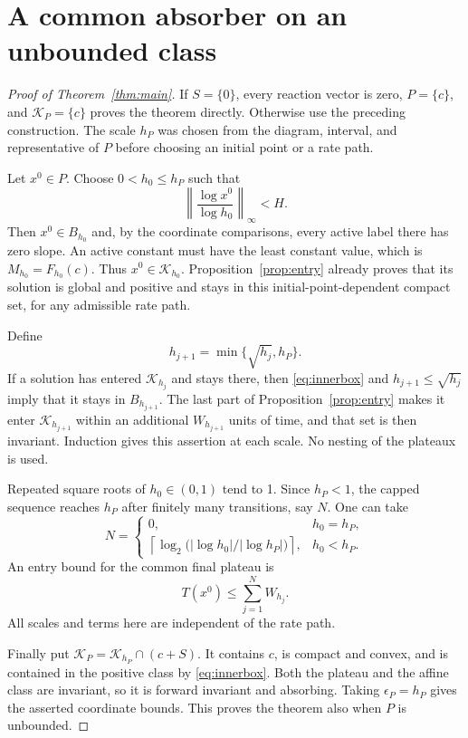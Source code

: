 \documentclass[11pt]{article}
\theoremstyle{definition}
\theoremstyle{remark}
\newcommand{\norm}[1]{\left\|#1\right\|}
\numberwithin{equation}{section}
\begin{document}
\section{A common absorber on an unbounded class}
\label{sec:absorption}

\begin{proof}[Proof of Theorem~\ref{thm:main}]
If $S=\{0\}$, every reaction vector is zero, $P=\{c\}$,
and $\mathcal K_P=\{c\}$ proves the theorem directly. Otherwise
use the preceding construction. The scale $h_P$ was chosen
from the diagram, interval, and representative of $P$ before
choosing an initial point or a rate path.

Let $x^0\in P$. Choose $0<h_0\leq h_P$ such that
\[
 \norm{\frac{\log x^0}{\log h_0}}_\infty<H.
\]
Then $x^0\in B_{h_0}$ and, by the coordinate comparisons, every
active label there has zero slope. An active constant must have
the least constant value, which is $M_{h_0}=F_{h_0}(c)$.
Thus $x^0\in\mathcal K_{h_0}$. Proposition~\ref{prop:entry}
already proves that its solution is global and positive and
stays in this initial-point-dependent compact set, for any
admissible rate path.

Define
\begin{equation}
 h_{j+1}=\min\{\sqrt{h_j},h_P\}.
 \label{eq:scalesequence}
\end{equation}
If a solution has entered $\mathcal K_{h_j}$ and stays there,
then \eqref{eq:innerbox} and $h_{j+1}\leq\sqrt{h_j}$ imply
that it stays in $B_{h_{j+1}}$. The last part of
Proposition~\ref{prop:entry} makes it enter
$\mathcal K_{h_{j+1}}$ within an additional $W_{h_{j+1}}$ units
of time, and that set is then invariant. Induction gives this
assertion at each scale. No nesting of the plateaux is used.

Repeated square roots of $h_0\in(0,1)$ tend to 1. Since
$h_P<1$, the capped sequence reaches $h_P$ after finitely many
transitions, say $N$. One can take
\[
 N=\begin{cases}
 0,&h_0=h_P,\\[2pt]
 \left\lceil\log_2\bigl(|\log h_0|/|\log h_P|\bigr)\right\rceil,
          &h_0<h_P.
 \end{cases}
\]
An entry bound for the common final plateau is
\begin{equation}
 T(x^0)\leq\sum_{j=1}^N W_{h_j}.
 \label{eq:entrybound}
\end{equation}
All scales and terms here are independent of the rate path.

Finally put $\mathcal K_P=\mathcal K_{h_P}\cap(c+S)$.
It contains $c$, is compact and convex, and is contained in
the positive class by \eqref{eq:innerbox}. Both the plateau
and the affine class are invariant, so it is forward invariant
and absorbing. Taking $\epsilon_P=h_P$ gives the asserted
coordinate bounds. This proves the theorem also when $P$ is
unbounded.
\end{proof}
\end{document}
